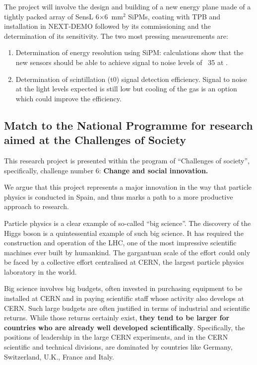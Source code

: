 \documentclass[a4paper,11pt,oneside]{article}
\begin{document}
The project will involve the design and building of a new energy plane
made of a tightly packed array of SensL 6$\times$6~mm$^2$ SiPMs,
coating with TPB and installation in NEXT-DEMO followed by its commissioning and the determination
of its sensitivity. The two most pressing measurements are:
\begin{enumerate}
  \item Determination of energy resolution using SiPM: calculations
    show that the new sensors should be able to achieve signal to
    noise levels of ~35 at \Qbb.
  \item Determination of scintillation (t0) signal detection
    efficiency. Signal to noise at the light levels expected is still
    low but cooling of the gas is an option which could improve the
    efficiency.
\end{enumerate}

\subsection*{Match to the National Programme for research aimed at the
  Challenges of Society}
This research project is presented within the program of ``Challenges of society'', specifically, challenge number 6: {\bf Change and social innovation.}

We argue that this project represents a major innovation in the way that particle physics is conducted in Spain, and thus marks a path to a more productive approach to research.

Particle physics is a clear example of so-called ``big science''. The discovery of the Higgs boson is a quintessential example of such big science. It has required the construction and operation of the LHC, one of the most impressive scientific machines ever built by humankind. The gargantuan scale of the effort could only be faced by a collective effort centralised at CERN, the largest particle physics laboratory in the world.  

Big science involves big budgets, often invested in purchasing equipment to be installed at CERN and in paying scientific staff whose activity also develops at CERN. Such large budgets are often justified in terms of industrial and scientific returns. While those returns certainly exist, {\bf they tend to be larger for countries who are already well developed scientifically}. Specifically, the positions of leadership in the large CERN experiments, and in the CERN scientific and technical divisions, are dominated by countries like Germany, Switzerland, U.K., France and Italy. 
\end{document}
